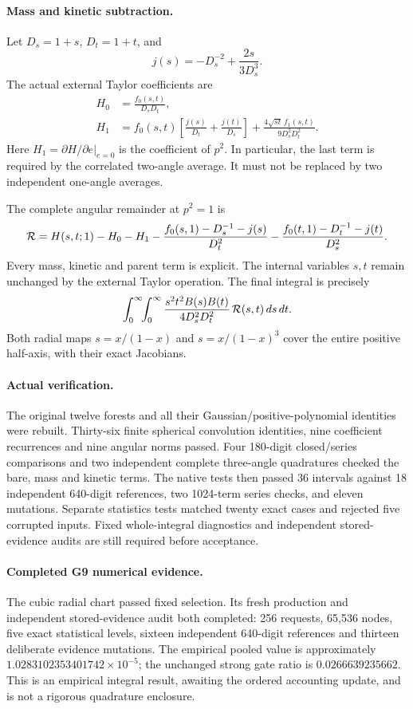 \documentclass[11pt]{article}
\begin{document}
\paragraph{Mass and kinetic subtraction.}
Let $D_s=1+s$, $D_t=1+t$, and
\[
 j(s)=-D_s^{-2}+\frac{2s}{3D_s^3}.
\]
The actual external Taylor coefficients are
\begin{align*}
 H_0&=\frac{f_0(s,t)}{D_sD_t},\\
 H_1&=f_0(s,t)\left[\frac{j(s)}{D_t}+\frac{j(t)}{D_s}\right]
 +\frac{4\sqrt{st}\,f_1(s,t)}{9D_s^2D_t^2}.
\end{align*}
Here $H_1=\partial H/\partial e|_{e=0}$ is the coefficient of $p^2$.
In particular, the last term is required by the correlated two-angle
average. It must not be replaced by two independent one-angle averages.

The complete angular remainder at $p^2=1$ is
\[
 {\cal R}=H(s,t;1)-H_0-H_1
 -\frac{f_0(s,1)-D_s^{-1}-j(s)}{D_t^2}
 -\frac{f_0(t,1)-D_t^{-1}-j(t)}{D_s^2}.
\]
Every mass, kinetic and parent term is explicit. The internal variables
$s,t$ remain unchanged by the external Taylor operation.
The final integral is precisely
\[
 \int_0^\infty\!\!\int_0^\infty
 \frac{s^2t^2 B(s)B(t)}{4D_s^2D_t^2}\,
 {\cal R}(s,t)\,ds\,dt .
\]
Both radial maps $s=x/(1-x)$ and $s=x/(1-x)^3$ cover the entire
positive half-axis, with their exact Jacobians.

\paragraph{Actual verification.}
The original twelve forests and all their Gaussian/positive-polynomial
identities were rebuilt. Thirty-six finite spherical convolution
identities, nine coefficient recurrences and nine angular norms passed.
Four 180-digit closed/series comparisons and two independent complete
three-angle quadratures checked the bare, mass and kinetic terms.
The native tests then passed 36 intervals against 18 independent
640-digit references, two 1024-term series checks, and eleven mutations.
Separate statistics tests matched twenty exact cases and rejected
five corrupted inputs. Fixed whole-integral diagnostics and independent
stored-evidence audits are still required before acceptance.
\paragraph{Completed G9 numerical evidence.}
The cubic radial chart passed fixed selection. Its fresh production and
independent stored-evidence audit both completed: 256 requests,
65,536 nodes, five exact statistical levels, sixteen independent
640-digit references and thirteen deliberate evidence mutations.
The empirical pooled value is approximately
$1.0283102353401742\times10^{-5}$; the unchanged strong gate ratio
is $0.0266639235662$. This is an empirical integral result, awaiting
the ordered accounting update, and is not a rigorous quadrature enclosure.
\end{document}
